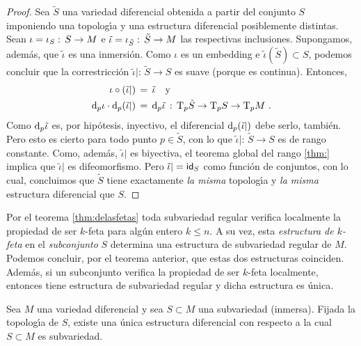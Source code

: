 \begin{proof}
	Sea $\tilde{S}$ una variedad diferencial obtenida a partir del
	conjunto $S$ imponiendo una topolog\'{\i}a y una estructura diferencial
	posiblemente distintas. Sean $\iota=\inc[S]:\,S\rightarrow M$ e
	$\tilde{\iota}=\inc[\tilde{S}]:\,\tilde{S}\rightarrow M$ las
	respectivas inclusiones. Supongamos, adem\'{a}s, que $\tilde{\iota}$
	es una inmersi\'{o}n. Como $\iota$ es un embedding e
	$\tilde{\iota}(\tilde{S})\subset S$, podemos concluir que la
	correstricci\'{o}n $\tilde{\iota}|:\,\tilde{S}\rightarrow S$ es
	suave (porque es continua). Entonces,
	\begin{align*}
		\iota\circ(\tilde{\iota}|) & \,=\,\tilde{\iota}
			\quad\text{y} \\
		\diferencial[p]{\iota}\cdot\diferencial[p]{(\tilde{\iota}|)}
			& \,=\,\diferencial[p]{\tilde{\iota}}
			\,:\,\tangente[p]{\tilde{S}}\rightarrow
				\tangente[p]{S}\rightarrow\tangente[p]{M}
		\text{ .}
	\end{align*}
	Como $\diferencial[p]{\tilde{\iota}}$ es, por hip\'{o}tesis, inyectivo,
	el diferencial $\diferencial[p]{(\tilde{\iota}|)}$ debe serlo,
	tambi\'{e}n. Pero esto es cierto para todo punto $p\in\tilde{S}$,
	con lo que $\tilde{\iota}|:\,\tilde{S}\rightarrow S$ es de rango
	constante. Como, adem\'{a}s, $\tilde{\iota}|$ es biyectiva, el
	teorema global del rango \ref{thm:} implica que $\tilde{\iota}|$
	es difeomorfismo. Pero $\tilde{\iota}|=\id[S]$ como funci\'{o}n
	de conjuntos, con lo cual, concluimos que $\tilde{S}$ tiene
	exactamente \emph{la misma} topolog\'{\i}a y \emph{la misma}
	estructura diferencial que $S$.
\end{proof}

\begin{obsUnicidadDeLaEstructuraRegular}%
	\label{obs:unicidaddelaestructuraregular}
	Por el teorema \ref{thm:delasfetas} toda subvariedad regular verifica
	localmente la propiedad de ser $k$-feta para alg\'{u}n entero
	$k\leq n$. A su vez, esta \emph{estructura de $k$-feta} en el
	\emph{subconjunto} $S$ determina una estructura de subvariedad
	regular de $M$. Podemos concluir, por el teorema anterior, que estas
	dos estructuras coinciden. Adem\'{a}s, si un subconjunto verifica la
	propiedad de ser $k$-feta localmente, entonces tiene estructura de
	subvariedad regular y dicha estructura es \'{u}nica.
\end{obsUnicidadDeLaEstructuraRegular}

\begin{teoUnicidadDeLaEstructuraInmersa}%
	\label{thm:unicidaddelaestructurainmersa}
	Sea $M$ una variedad diferencial y sea $S\subset M$ una
	subvariedad (inmersa). Fijada la topolog\'{\i}a de $S$, existe una
	\'{u}nica estructura diferencial con respecto a la cual
	$S\subset M$ es subvariedad.
\end{teoUnicidadDeLaEstructuraInmersa}


